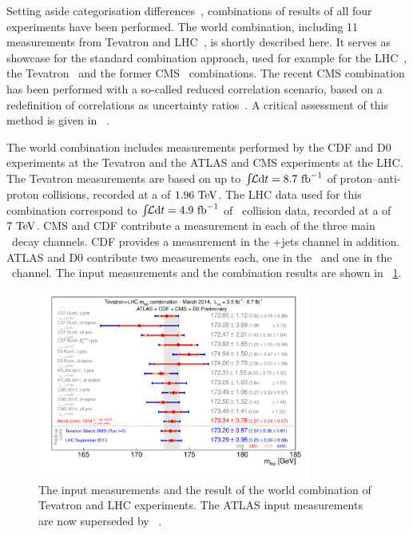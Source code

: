 Setting aside categorisation differences~\cite{Top2015combinissues}, combinations of results of all four experiments have been performed. The world combination, including 11 measurements from Tevatron and \gls{LHC}~\cite{ATLAS:2014wva}, is shortly described here. It serves as showcase for the standard combination approach, used for example for the \gls{LHC}~\cite{LHC2013}, the Tevatron~\cite{TEWG2014} and the former \gls{CMS}~\cite{CMS-PAS-TOP-14-015} combinations. The recent \gls{CMS} combination has been performed with a so-called reduced correlation scenario, based on a redefinition of correlations as uncertainty ratios~\cite{Khachatryan:2015hba}. A critical assessment of this method is given in ~\cite{BLUERN}.

The world combination includes measurements performed by the \gls{CDF} and \gls{D0} experiments at the Tevatron and the \gls{ATLAS} and \gls{CMS} experiments at the \gls{LHC}. 
%
The Tevatron measurements are based on up to $\int\!\!{\mathcal L}\mathrm{d}t=8.7~\mathrm{fb}^{-1}$ of proton--anti-proton collisions, recorded at a \cme of $1.96~\mathrm{TeV}$. 
%
The \gls{LHC} data used for this combination correspond to $\int\!\!{\mathcal L}\mathrm{d}t=4.9~\mathrm{fb}^{-1}$ of \pp\ collision data, recorded at a \cme of $7~\mathrm{TeV}$. 
%
\gls{CMS} and \gls{CDF} contribute a measurement in each of the three main \ttbar\ decay channels. \gls{CDF} provides a measurement in the \met+jets channel in addition. \gls{ATLAS} and \gls{D0} contribute two measurements each, one in the \ttbarll\ and one in the \ttbarlj\ channel. The input measurements and the combination results are shown in \fig~\ref{fig:worldcombisummary}.
%
%
\begin{figure}[tbp!]
\centering
\includegraphics[width=0.8\textwidth]{./figs/world_combi_summary.pdf}
\vspace{-0.5cm}
\caption[\Tquark\ mass world combination]{
%
The input measurements and the result of the world combination of Tevatron and \gls{LHC} experiments. The \gls{ATLAS} input measurements~\cite{ATLAS-CONF-2013-046,ATLAS-CONF-2013-077} are now superseded by ~\cite{Aad:2015nba}.
%
\label{fig:worldcombisummary}
}
\end{figure}
